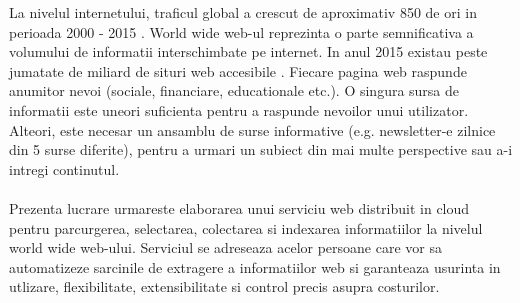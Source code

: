 La nivelul internetului, traficul global a crescut de aproximativ 850 de ori in perioada 2000 - 2015 \cite{cisco-internet-traffic}. World wide web-ul reprezinta o parte semnificativa a volumului de informatii interschimbate pe internet. In anul 2015 existau peste jumatate de miliard de situri web accesibile \cite{http://www.internetlivestats.com/total-number-of-websites/}. Fiecare pagina web raspunde anumitor nevoi (sociale, financiare, educationale etc.). O singura sursa de informatii este uneori suficienta pentru a raspunde nevoilor unui utilizator. Alteori, este necesar un ansamblu de surse informative (e.g. newsletter-e zilnice din 5 surse diferite), pentru a urmari un subiect din mai multe perspective sau a-i intregi continutul.
\\
\\
Prezenta lucrare urmareste elaborarea unui serviciu web distribuit in cloud pentru parcurgerea, selectarea, colectarea si indexarea informatiilor la nivelul world wide web-ului. Serviciul se adreseaza acelor persoane care vor sa automatizeze sarcinile de extragere a informatiilor web si garanteaza usurinta in utlizare, flexibilitate, extensibilitate si control precis asupra costurilor.
